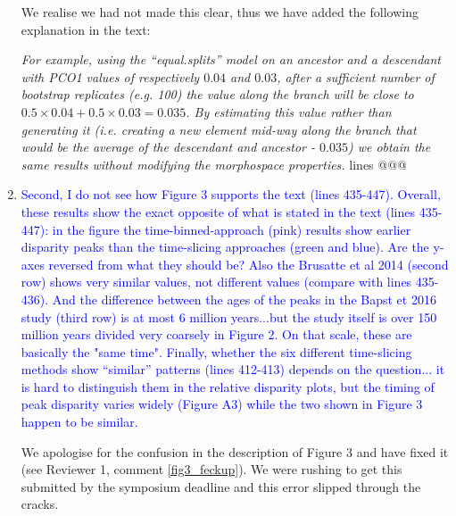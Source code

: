 \documentclass[12pt,letterpaper]{article}
\begin{document}
\begin{enumerate}
We realise we had not made this clear, thus we have added the following explanation in the text:

\textit{For example, using the ``equal.splits'' model on an ancestor and a descendant with PCO1 values of respectively $0.04$ and $0.03$, after a sufficient number of bootstrap replicates (e.g. 100) the value along the branch will be close to $0.5\times0.04 + 0.5\times0.03 = 0.035$.
By estimating this value rather than generating it (i.e. creating a new element mid-way along the branch that would be the average of the descendant and ancestor - $0.035$) we obtain the same results without modifying the morphospace properties.} lines @@@





\item{\textcolor{blue}{Second, I do not see how Figure 3 supports the text (lines 435-447). Overall, these results show the exact opposite of what is stated in the text (lines 435-447): in the figure the time-binned-approach (pink) results show earlier disparity peaks than the time-slicing approaches (green and blue). Are the y-axes reversed from what they should be? Also the Brusatte et al 2014 (second row) shows very similar values, not different values (compare with lines 435-436). And the difference between the ages of the peaks in the Bapst et 2016 study (third row) is at most 6 million years...but the study itself is over 150 million years divided very coarsely in Figure 2.  On that scale, these are basically the "same time". Finally, whether the six different time-slicing methods show ``similar'' patterns (lines 412-413) depends on the question... it is hard to distinguish them in the relative disparity plots, but the timing of peak disparity varies widely (Figure A3) while the two shown in Figure 3 happen to be similar.}}

We apologise for the confusion in the description of Figure 3 and have fixed it (see Reviewer 1, comment \ref{fig3_feckup}). We were rushing to get this submitted by the symposium deadline and this error slipped through the cracks.



\end{enumerate}
\end{document}

